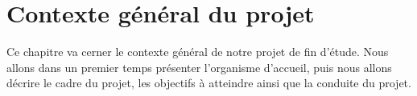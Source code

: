 
\chapter{Contexte général du projet}
Ce chapitre va cerner le contexte général de notre projet de fin d'étude. Nous allons dans un premier temps présenter l'organisme d'accueil, puis nous allons décrire le cadre du projet, les objectifs à atteindre ainsi que la conduite du projet.




